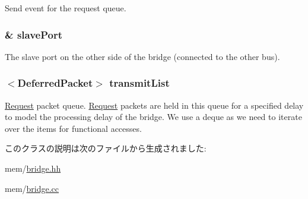 \label{classBridge_1_1BridgeMasterPort_ac65e9e742d994553fd80b8b38c2bd5dd}
Send event for the request queue. \hypertarget{classBridge_1_1BridgeMasterPort_a1e08ec2f17b79c544fef06a37d6b4ba3}{
\subsubsection[{slavePort}]{\& {\bf slavePort}}}
\label{classBridge_1_1BridgeMasterPort_a1e08ec2f17b79c544fef06a37d6b4ba3}
The slave port on the other side of the bridge (connected to the other bus). \hypertarget{classBridge_1_1BridgeMasterPort_a640fbfa2436c06d6f64608f76261e6e5}{
\subsubsection[{transmitList}]{$<${\bf DeferredPacket}$>$ {\bf transmitList}}}
\label{classBridge_1_1BridgeMasterPort_a640fbfa2436c06d6f64608f76261e6e5}
\hyperlink{classRequest}{Request} packet queue. \hyperlink{classRequest}{Request} packets are held in this queue for a specified delay to model the processing delay of the bridge. We use a deque as we need to iterate over the items for functional accesses. 

このクラスの説明は次のファイルから生成されました:\begin{DoxyCompactItemize}
\item 
mem/\hyperlink{bridge_8hh}{bridge.hh}\item 
mem/\hyperlink{bridge_8cc}{bridge.cc}\end{DoxyCompactItemize}

